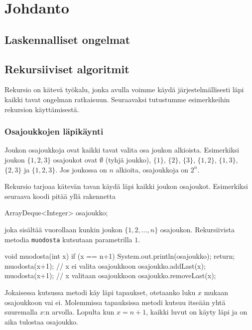\chapter{Johdanto}

\section{Laskennalliset ongelmat}

\section{Rekursiiviset algoritmit}

Rekursio on kätevä työkalu, jonka avulla voimme käydä
järjestelmällisesti läpi kaikki tavat ongelman ratkaisuun.
Seuraavaksi tutustumme esimerkkeihin rekursion käyttämisestä.

\subsection{Osajoukkojen läpikäynti}

Joukon osajoukkoja ovat kaikki tavat valita osa joukon alkioista.
Esimerkiksi joukon $\{1,2,3\}$ osajoukot ovat
$\emptyset$ (tyhjä joukko), $\{1\}$, $\{2\}$, $\{3\}$,
$\{1,2\}$, $\{1,3\}$, $\{2,3\}$ ja $\{1,2,3\}$.
Jos joukossa on $n$ alkioita, osajoukkoja on $2^n$.

Rekursio tarjoaa kätevän tavan käydä läpi kaikki
joukon osajoukot. Esimerkiksi seuraava koodi pitää yllä
rakennetta

\begin{code}
ArrayDeque<Integer> osajoukko;
\end{code}

joka sisältää vuorollaan kunkin joukon $\{1,2,\dots,n\}$
osajoukon. Rekursiivista metodia \texttt{muodosta} kutsutaan
parametrilla $1$.

\begin{code}
void muodosta(int x) {
    if (x == n+1) {
        System.out.println(osajoukko);
        return;
    }
    muodosta(x+1); // x ei valita osajoukkoon
    osajoukko.addLast(x);
    muodosta(x+1); // x valitaan osajoukkoon
    osajoukko.removeLast(x);
}
\end{code}

Jokaisessa kutsussa metodi käy läpi tapaukset,
otetaanko luku $x$ mukaan osajoukkoon vai ei.
Molemmissa tapauksissa metodi kutsuu itseään yhtä
suuremalla $x$:n arvolla.
Lopulta kun $x=n+1$, kaikki luvut on käyty läpi
ja on aika tulostaa osajoukko.

